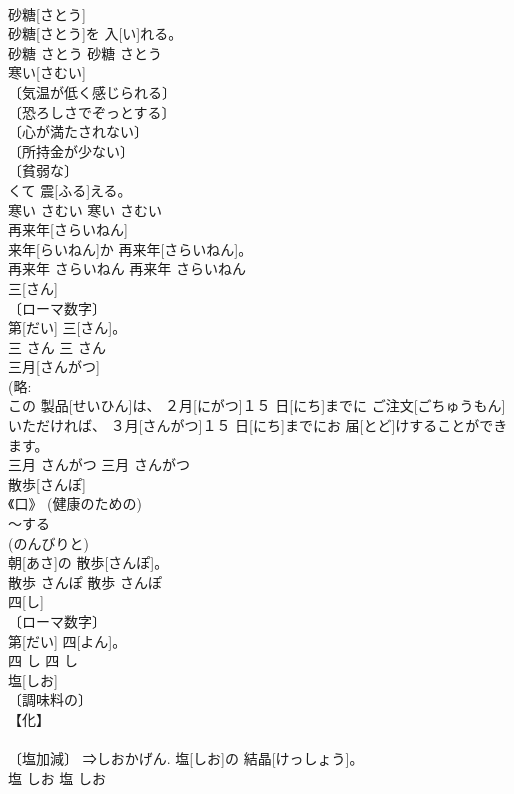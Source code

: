\documentclass[8pt]{extreport}
\begin{document}
\begin{CJK}{UTF8}{min}
\\	砂糖[さとう]	
\\	[＝スクロース, サッカロース, しょとう４]	砂糖[さとう]を 入[い]れる。	
\\	砂糖	さとう	砂糖	さとう	
\\	寒い[さむい]	
\\	〔気温が低く感じられる〕 
\\	〔恐ろしさでぞっとする〕 
\\	〔心が満たされない〕 
\\	〔所持金が少ない〕 
\\	〔貧弱な〕 
\\	[＝おさむい 
\\	寒[さむ]くて 震[ふる]える。	
\\	寒い	さむい	寒い	さむい	
\\	再来年[さらいねん]	
\\	来年[らいねん]か 再来年[さらいねん]。	
\\	再来年	さらいねん	再来年	さらいねん	
\\	三[さん]	
\\	〔ローマ数字〕 
\\	第[だい] 三[さん]。	
\\	三	さん	三	さん	
\\	三月[さんがつ]	
\\	(略: 
\\	この 製品[せいひん]は、 ２月[にがつ]１５ 日[にち]までに ご注文[ごちゅうもん]いただければ、 ３月[さんがつ]１５ 日[にち]までにお 届[とど]けすることができます。	
\\	三月	さんがつ	三月	さんがつ	
\\	散歩[さんぽ]	
\\	《口》 (健康のための) 
\\	～する 
\\	(のんびりと) 
\\	朝[あさ]の 散歩[さんぽ]。	
\\	散歩	さんぽ	散歩	さんぽ	
\\	四[し]	
\\	〔ローマ数字〕 
\\	第[だい] 四[よん]。	
\\	四	し	四	し	
\\	塩[しお]	
\\	〔調味料の〕 
\\	【化】 
\\	[＝塩化ナトリウム (⇒えんか８)] 
\\	〔塩加減〕 ⇒しおかげん.	塩[しお]の 結晶[けっしょう]。	
\\	塩	しお	塩	しお	

\end{CJK}
\end{document}
